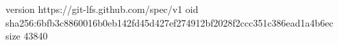 version https://git-lfs.github.com/spec/v1
oid sha256:6bfb3c8860016b0eb142fd45d427ef274912bf2028f2ccc351c386ead1a4b6ec
size 43840
